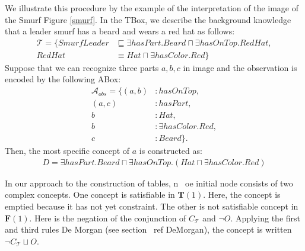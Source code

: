 \documentclass{article}
\begin{document}
We illustrate this procedure by the example of the interpretation of the image of the Smurf Figure \ref{smurf}.
In the TBox, we describe the background knowledge that a leader smurf has a beard and wears a red hat as follows:
\begin{align*}
\mathcal{T}=\{SmurfLeader &\sqsubseteq \exists hasPart.Beard \sqcap \exists hasOnTop.RedHat, \\
RedHat &\equiv Hat \sqcap \exists hasColor.Red \} 
\end{align*}
Suppose that we can recognize three parts $a,b,c$ in image and the observation is encoded by the following ABox:
\begin{align*}
\mathcal{A}_{obs} =\{(a,b)&: hasOnTop, \\
 (a,c)&: hasPart,\\
 b&:Hat,\\
 b&:\exists hasColor.Red,\\
 c&:Beard\}.
\end{align*}
Then, the most specific concept of $a$ is constructed as:
\begin{align*}
D=\exists hasPart.Beard \sqcap \exists hasOnTop.(Hat \sqcap  \exists hasColor.Red) 
\end{align*}

In our approach to the construction of tables, n {\ oe} initial node consists of two complex concepts.
One concept is satisfiable in $ \mathbf{T}(1) $. Here, the concept is emptied because it has not yet constraint.
The other is not satisfiable concept in $ \mathbf{F} (1) $. Here is the negation of the conjunction of $ C_\mathcal{T}$ and $ \neg O$. Applying the first and third rules
De Morgan (see section \ ref {} DeMorgan), the concept is written $\neg C_\mathcal{T} \sqcup O$.
\end{document}
